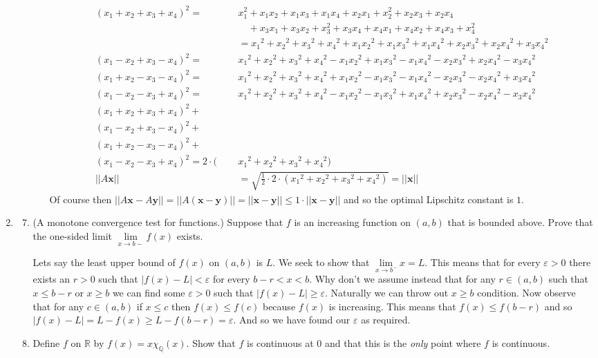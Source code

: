 \documentclass[letterpaper]{article}
\begin{document}
\begin{enumerate}
\begin{enumerate}
\begin{enumerate}
      \begin{align*}
        (x_1+x_2+x_3+x_4)^2=&x_1^2+x_1x_2+x_1x_3+x_1x_4+x_2x_1+x_2^2+x_2x_3+x_2x_4\\
        &\quad+x_3x_1+x_3x_2+x_3^2+x_3x_4+x_4x_1+x_4x_2+x_4x_3+x_4^2\\
        &={x_1}^2+{x_2}^2+{x_3}^2+{x_4}^2+{x_1x_2}^2+{x_1x_3}^2+{x_1x_4}^2+{x_2x_3}^2+{x_2x_4}^2+{x_3x_4}^2\\
        (x_1-x_2+x_3-x_4)^2=&{x_1}^2+{x_2}^2+{x_3}^2+{x_4}^2-{x_1x_2}^2+{x_1x_3}^2-{x_1x_4}^2-{x_2x_3}^2+{x_2x_4}^2-{x_3x_4}^2\\
        (x_1+x_2-x_3-x_4)^2=&{x_1}^2+{x_2}^2+{x_3}^2+{x_4}^2+{x_1x_2}^2-{x_1x_3}^2-{x_1x_4}^2-{x_2x_3}^2-{x_2x_4}^2+{x_3x_4}^2\\
        (x_1-x_2-x_3+x_4)^2=&{x_1}^2+{x_2}^2+{x_3}^2+{x_4}^2-{x_1x_2}^2-{x_1x_3}^2+{x_1x_4}^2+{x_2x_3}^2-{x_2x_4}^2-{x_3x_4}^2\\
        (x_1+x_2+x_3+x_4)^2+\qquad\quad\\
        (x_1-x_2+x_3-x_4)^2+\qquad\quad\\
        (x_1+x_2-x_3-x_4)^2+\qquad\quad\\
        (x_1-x_2-x_3+x_4)^2=2\cdot(&{x_1}^2+{x_2}^2+{x_3}^2+{x_4}^2)\\
        ||A\boldsymbol{x}||&=\sqrt{\frac{1}{2}\cdot2\cdot({x_1}^2+{x_2}^2+{x_3}^2+{x_4}^2)}=||\boldsymbol{x}||
      \end{align*}
      Of course then $||A\boldsymbol{x}-A\boldsymbol{y}||=||A(\boldsymbol{x}-\boldsymbol{y})||=||\boldsymbol{x}-\boldsymbol{y}||\le1\cdot||\boldsymbol{x}-\boldsymbol{y}||$ and so the optimal Lipschitz constant is $1$.
    \end{enumerate}
  \end{enumerate}
\item
  \begin{enumerate}
  \setcounter{enumii}{6}
  \item
    (A monotone convergence test for functions.) Suppose that $f$ is an increasing function on $(a,b)$ that is bounded above. Prove that the one-sided limit $\lim\limits_{x\to b-}f(x)$ exists.

  Lets say the least upper bound of $f(x)$ on $(a,b)$ is $L$. We seek to show that $\lim\limits_{x\to b^-}{x}=L$. This means that for every $\varepsilon>0$ there exists an $r>0$ such that $|f(x)-L|<\varepsilon$ for every $b-r<x<b$.
  Why don't we assume instead that for any $r\in(a,b)$ such that $x\le b-r$ or $x\ge b$ we can find some $\varepsilon>0$ such that $|f(x)-L|\ge \varepsilon$.
  Naturally we can throw out $x\ge b$ condition.
  Now observe that for any $c\in (a,b)$ if $x\le c$ then $f(x)\le f(c)$ because $f(x)$ is increasing. This means that $f(x)\le f(b-r)$ and so $|f(x)-L|=L-f(x)\ge L-f(b-r)=\varepsilon$. And so we have found our $\varepsilon$ as required.
  \item
    Define $f$ on $\mathbb{R}$ by $f(x)=x\chi_\mathbb{Q}(x)$. Show that $f$ is continuous at 0 and that this is the {\em only} point where $f$ is continuous.


\end{enumerate}
\end{enumerate}
\end{document}
